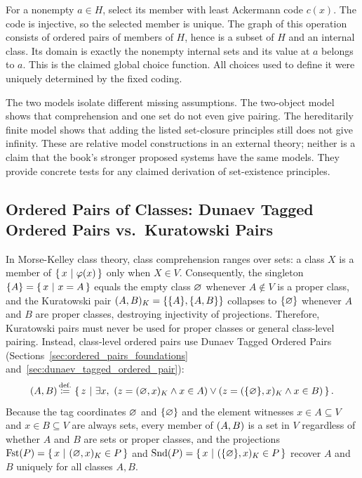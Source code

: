 For a nonempty $a\in H$, select its member with least Ackermann code
$c(x)$. The code is injective, so the selected member is unique.
The graph of this operation consists of ordered pairs of members of
$H$, hence is a subset of $H$ and an internal class. Its domain is
exactly the nonempty internal sets and its value at $a$ belongs to $a$.
This is the claimed global choice function. All choices used to define
it were uniquely determined by the fixed coding.
\Done

The two models isolate different missing assumptions. The two-object
model shows that comprehension and one set do not even give pairing.
The hereditarily finite model shows that adding the listed set-closure
principles still does not give infinity. These are relative model
constructions in an external theory; neither is a claim that the
book's stronger proposed systems have the same models. They provide
concrete tests for any claimed derivation of set-existence principles.

\subsection{Ordered Pairs of Classes: Dunaev Tagged Ordered Pairs vs.\ Kuratowski Pairs}
\label{subsec:dunaev_vs_kuratowski_pairs}

In Morse-Kelley class theory, class comprehension ranges over sets: a class
$X$ is a member of $\left\{\,x\ \middle|\ \varphi(x)\,\right\}$ only when $X \in V$. Consequently, the
singleton $\{A\} = \left\{\,x\ \middle|\ x = A\,\right\}$ equals the empty class $\varnothing$ whenever
$A \notin V$ is a proper class, and the Kuratowski pair
$(A,B)_K = \{\{A\}, \{A, B\}\}$ collapses to $\{\varnothing\}$
whenever $A$ and $B$ are proper classes, destroying injectivity of projections.
Therefore, Kuratowski pairs must never be used for proper classes or general
class-level pairing. Instead, class-level ordered pairs use Dunaev Tagged
Ordered Pairs (Sections~\ref{sec:ordered_pairs_foundations} and~\ref{sec:dunaev_tagged_ordered_pair}):
\[
(A,B) \,{\stackrel{{\textrm{def.}}}{\coloneqq}}\, \left\{\,z\ \middle|\ \exists x,\ (z = (\varnothing,x)_K \land x \in A) \lor (z = (\{\varnothing\},x)_K \land x \in B)\,\right\}.
\]
Because the tag coordinates $\varnothing$ and $\{\varnothing\}$ and the element
witnesses $x \in A \subseteq V$ and $x \in B \subseteq V$ are always sets,
every member of $(A,B)$ is a set in $V$ regardless of whether $A$ and $B$
are sets or proper classes, and the projections
$\operatorname{Fst}(P) = \left\{\,x\ \middle|\ (\varnothing,x)_K \in P\,\right\}$ and
$\operatorname{Snd}(P) = \left\{\,x\ \middle|\ (\{\varnothing\},x)_K \in P\,\right\}$ recover $A$ and $B$
uniquely for all classes $A, B$.

